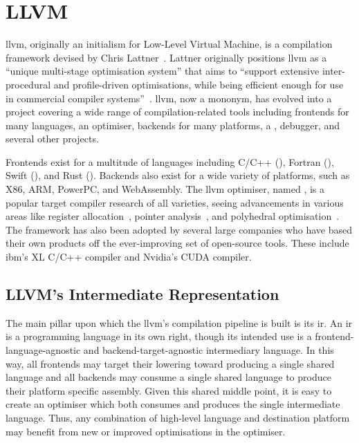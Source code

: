\documentclass[\main/thesis.tex]{subfiles}
\begin{document}
\section{LLVM}
\label{sec:llvm}
\Gls{llvm}, originally an initialism for Low-Level Virtual Machine, is a compilation framework devised by Chris Lattner~\autocite{lattner2002llvm,lattner2004llvm}.
Lattner originally positions \gls{llvm} as a ``unique multi-stage optimisation system'' that aims to ``support extensive inter-procedural and profile-driven optimisations, while being efficient enough for use in commercial compiler systems''~\autocite{lattner2002llvm}.
\Gls{llvm}, now a mononym, has evolved into a project covering a wide range of compilation-related tools including frontends for many languages, an optimiser, backends for many platforms, a , debugger, and several other projects.

Frontends exist for a multitude of languages including C/C++ (), Fortran (), Swift (), and Rust ().
Backends also exist for a wide variety of platforms, such as X86, ARM, PowerPC, and WebAssembly.
The \gls{llvm} optimiser, named , is a popular target compiler research of all varieties, seeing advancements in various areas like register allocation~\autocite{lozano2019combinatorial,pereira2008register}, pointer analysis~\autocite{hardekopf2009semi,sui2016interprocedural}, and polyhedral optimisation~\autocite{grosser2011polly,alves2015runtime}.
The framework has also been adopted by several large companies who have based their own products off the ever-improving set of open-source tools.
These include \gls{ibm}'s XL C/C++ compiler and Nvidia's CUDA compiler.

\subsection{LLVM's Intermediate Representation}
\label{sec:ir}
The main pillar upon which the \gls{llvm}'s compilation pipeline is built is its \gls{ir}.
An \gls{ir} is a programming language in its own right, though its intended use is a frontend-language-agnostic and backend-target-agnostic intermediary language.
In this way, all frontends may target their \gls{lowering} toward producing a single shared language and all backends may consume a single shared language to produce their platform specific assembly.
Given this shared middle point, it is easy to create an optimiser which both consumes and produces the single intermediate language.
Thus, any combination of high-level language and destination platform may benefit from new or improved optimisations in the optimiser.
\end{document}
